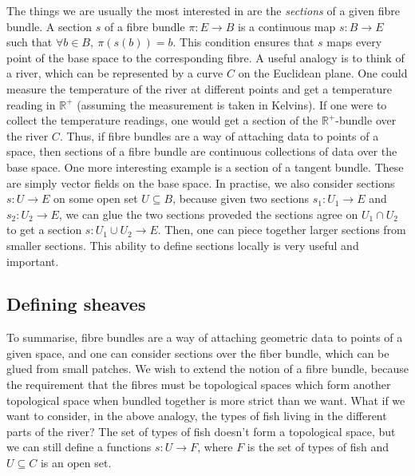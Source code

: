 The things we are usually the most interested in are the \emph{sections} of
a given fibre bundle. A section $s$ of a fibre bundle $\pi:E\to B$
is a continuous map $s:B\to E$ such that $\forall b\in B,\ \pi(s(b))=b$.
This condition ensures that $s$ maps every point of the base space to the
corresponding fibre. A useful analogy is to think of a river, which can
be represented by a curve $C$ on the Euclidean plane. One could measure the
temperature of the river at different points and get a temperature reading
in $\mathbb{R}^{+}$ (assuming the measurement is taken in Kelvins).
If one were to collect the temperature readings, one would get a section of
the $\mathbb{R}^{+}$-bundle over the river $C$. Thus, if fibre bundles are a
way of attaching data to points of a space, then sections of a fibre bundle
are continuous collections of data over the base space.
One more interesting
example is a section of a tangent bundle. These are simply vector fields
on the base space.
In practise, we also consider sections $s:U\to E$ on some open set
$U\subseteq B$, because given two sections $s_{1}:U_{1}\to E$ and
$s_{2}:U_{2}\to E$, we can glue the two sections proveded the sections
agree on $U_{1}\cap U_{2}$ to get a section $s:U_{1}\cup U_{2}\to E$.
Then, one can piece together larger sections from smaller sections. This
ability to define sections locally is very useful and important.

\subsection{Defining sheaves}
To summarise, fibre bundles are a way of attaching geometric data to
points of a given space, and one can consider sections over the fiber
bundle, which can be glued from small patches. We wish to extend the notion
of a fibre bundle, because the requirement that the fibres must be
topological spaces which form another topological space when bundled
together is more strict than we want. What if we want to consider, in
the above analogy, the types of fish living in the different parts of the
river? The set of types of fish doesn't form a topological space, but we
can still define a functions $s:U\to F$, where $F$ is the set of types
of fish and $U\subseteq C$ is an open set.

